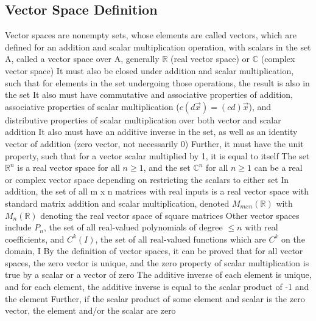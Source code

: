 \documentclass[11 pt, twoside]{article}
\newenvironment{outline*}
{
	\begin{outline}[enumerate]
	}
	{\end{outline}
}
\begin{document}
\subsection{Vector Space Definition}
\begin{outline*}
\1 Vector spaces are nonempty sets, whose elements are called vectors, which are defined for an addition and scalar multiplication operation, with scalars in the set A, called a vector space over A, generally $\mathbb{R}$ (real vector space) or $\mathbb{C}$ (complex vector space)
\2 It must also be closed under addition and scalar multiplication, such that for elements in the set undergoing those operations, the result is also in the set
\2 It also must have commutative and associative properties of addition, associative properties of scalar multiplication ($c(d\vec{x}) = (cd)\vec{x}$), and distributive properties of scalar multiplication over both vector and scalar addition
\2 It also must have an additive inverse in the set, as well as an identity vector of addition (zero vector, not necessarily 0)
\2 Further, it must have the unit property, such that for a vector scalar multiplied by 1, it is equal to itself
\1 The set $\mathbb{R}^n$ is a real vector space for all $n \geq 1$, and the set $\mathbb{C}^n$ for all $n \geq 1$ can be a real or complex vector space depending on restricting the scalars to either set
\2 In addition, the set of all m x n matrices with real inputs is a real vector space with standard matrix addition and scalar multiplication, denoted $M_{mxn}(\mathbb{R})$ with $M_n(\mathbb{R})$ denoting the real vector space of square matrices
\2 Other vector spaces include $P_n$, the set of all real-valued polynomials of degree $\leq n$ with real coefficients, and $C^k(I)$, the set of all real-valued functions which are $C^k$ on the domain, I
\1 By the definition of vector spaces, it can be proved that for all vector spaces, the zero vector is unique, and the zero property of scalar multiplication is true by a scalar or a vector of zero
\2 The additive inverse of each element is unique, and for each element, the additive inverse is equal to the scalar product of -1 and the element
\2 Further, if the scalar product of some element and scalar is the zero vector, the element and/or the scalar are zero
\end{outline*}
\end{document}
